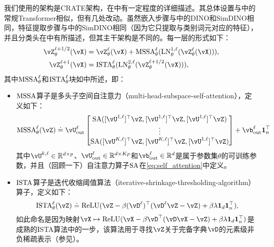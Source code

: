\documentclass[../../book-main.tex]{subfiles}
\begin{document}
我们使用的架构是CRATE架构，在中有一定程度的详细描述。其总体设置与中的常规Transformer相似，但有几处改动。虽然嵌入步骤与中的DINO和SimDINO相同，特征提取步骤与中的SimDINO相同（因为它只提取与类别词元对应的特征），并且分类头在中有所描述，但其主干架构是不同的。每一层的形式如下：
\begin{align}\label{eq:CARTE updates}
    \vZ_{\theta}^{\ell + 1/2}(\vX)
    &= \vZ_{\theta}^{\ell}(\vX) + \MSSA_{\theta}^{\ell}(\LN_{\theta}^{1, \ell}(\vZ_{\theta}^{\ell}(\vX))), \\ 
    \vZ_{\theta}^{\ell + 1}(\vX)
    &= \ISTA_{\theta}^{\ell}(\LN_{\theta}^{2, \ell}(\vZ_{\theta}^{\ell + 1/2}(\vX))),
\end{align}
其中\(\operatorname{MSSA}_{\theta}^{\ell}\)和\(\operatorname{ISTA}_{\theta}^{\ell}\)块如中所述，即：
\begin{itemize}
    \item \(\operatorname{MSSA}\)算子是多头子空间自注意力（multi-head-subspace-self-attention），定义如下：
    \begin{equation}
        \MSSA_{\theta}^{\ell}(\vZ) \doteq \vU_{\out}^{\ell}\mat{\SA([\vU^{1, \ell}]^{\top}\vZ, [\vU^{1, \ell}]^{\top}\vZ, [\vU^{1, \ell}]^{\top}\vZ)\\ \vdots \\ \SA([\vU^{K, \ell}]^{\top}\vZ, [\vU^{K, \ell}]^{\top}\vZ, [\vU^{1, \ell}]^{\top}\vZ)} + \vb_{\out}^{\ell}\vone_{n}^{\top}
    \end{equation}
    其中\(\vU^{k, \ell} \in \R^{d \times p}\)、\(\vU_{\out}^{\ell} \in \R^{d \times Kp}\)和\(\vb_{\out}^{\ell} \in \R^{d}\)是属于参数集\(\theta\)的可训练参数，并且（回顾一下）自注意力算子\(\operatorname{SA}\)在\eqref{eq:self_attention}中定义。
    \item \(\operatorname{ISTA}\)算子是迭代收缩阈值算法（iterative-shrinkage-thresholding-algorithm）算子，定义如下：
    \begin{equation}
        \ISTA_{\theta}^{\ell}(\vZ) \doteq \ReLU(\vZ - \beta (\vD^{\ell})^{\top}(\vD^{\ell}\vZ - \vZ) + \beta\lambda \vone_{d}\vone_{n}^{\top}),
    \end{equation}
    如此命名是因为映射\(\vX \mapsto \ReLU(\vX - \beta \vD^{\top}(\vD\vX - \vZ) + \beta  \lambda \vone_{d}\vone_{n}^{\top})\)是成熟的ISTA算法中的一步，该算法用于寻找\(\vZ\)关于完备字典\(\vD\)的元素级非负稀疏表示（参见）。
\end{itemize}
\end{document}
